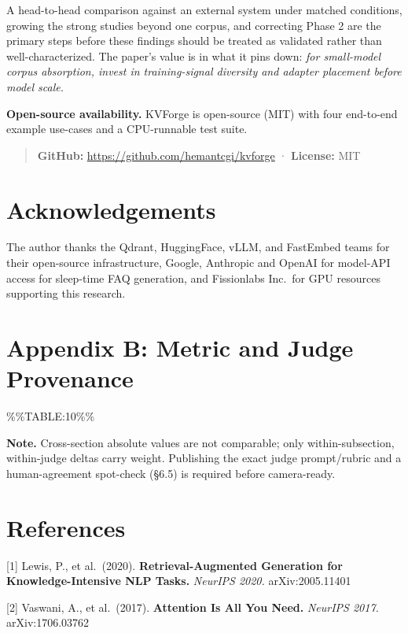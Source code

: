 A head-to-head comparison against an external system under matched conditions, growing the strong studies beyond one corpus, and correcting Phase 2 are the primary steps before these findings should be treated as validated rather than well-characterized. The paper's value is in what it pins down: \emph{for small-model corpus absorption, invest in training-signal diversity and adapter placement before model scale.}

\textbf{Open-source availability.} KVForge is open-source (MIT) with four end-to-end example use-cases and a CPU-runnable test suite.

\begin{quote}
\textbf{GitHub:} \url{https://github.com/hemantcgi/kvforge} · \textbf{License:} MIT
\end{quote}

\hypertarget{acknowledgements}{%
\section{Acknowledgements}\label{acknowledgements}}

The author thanks the Qdrant, HuggingFace, vLLM, and FastEmbed teams for their open-source infrastructure, Google, Anthropic and OpenAI for model-API access for sleep-time FAQ generation, and Fissionlabs Inc.~for GPU resources supporting this research.

\hypertarget{appendix-b-metric-and-judge-provenance}{%
\section{Appendix B: Metric and Judge Provenance}\label{appendix-b-metric-and-judge-provenance}}

\%\%TABLE:10\%\%

\textbf{Note.} Cross-section absolute values are not comparable; only within-subsection, within-judge deltas carry weight. Publishing the exact judge prompt/rubric and a human-agreement spot-check (§6.5) is required before camera-ready.

\hypertarget{references}{%
\section{References}\label{references}}

{[}1{]} Lewis, P., et al.~(2020). \textbf{Retrieval-Augmented Generation for Knowledge-Intensive NLP Tasks.} \emph{NeurIPS 2020.} arXiv:2005.11401

{[}2{]} Vaswani, A., et al.~(2017). \textbf{Attention Is All You Need.} \emph{NeurIPS 2017.} arXiv:1706.03762

